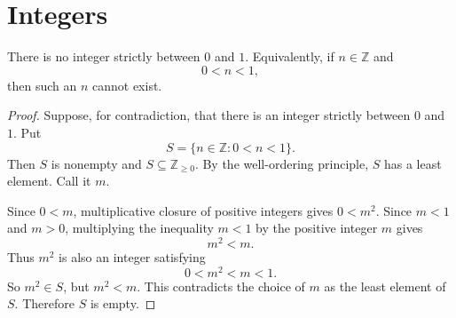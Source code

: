 \section{Integers}
\begin{lemma}[NIBZO]
There is no integer strictly between $0$ and $1$.  Equivalently, if
$n\in\mathbb{Z}$ and
\[
0<n<1,
\]
then such an $n$ cannot exist.
\end{lemma}

\begin{proof}
Suppose, for contradiction, that there is an integer strictly between $0$ and
$1$.  Put
\[
S=\{n\in\mathbb{Z}:0<n<1\}.
\]
Then $S$ is nonempty and $S\subseteq\mathbb{Z}_{\geq0}$.  By the well-ordering
principle, $S$ has a least element.  Call it $m$.

Since $0<m$, multiplicative closure of positive integers gives $0<m^2$.  Since
$m<1$ and $m>0$, multiplying the inequality $m<1$ by the positive integer $m$
gives
\[
m^2<m.
\]
Thus $m^2$ is also an integer satisfying
\[
0<m^2<m<1.
\]
So $m^2\in S$, but $m^2<m$.  This contradicts the choice of $m$ as the least
element of $S$.  Therefore $S$ is empty.
\end{proof}
